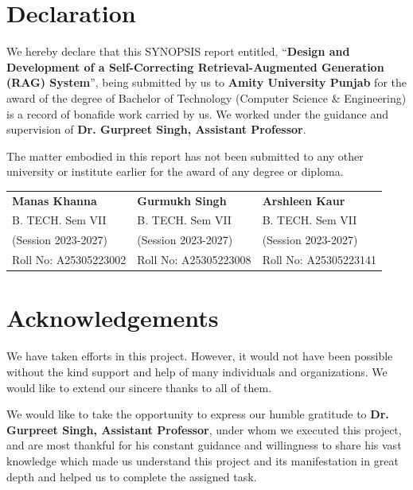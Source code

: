 \documentclass[12pt,a4paper]{article}
\begin{document}
\newpage
{}

\section*{Declaration}
We hereby declare that this SYNOPSIS report entitled, ``\textbf{Design and Development of a Self-Correcting Retrieval-Augmented Generation (RAG) System}'', being submitted by us to \textbf{Amity University Punjab} for the award of the degree of Bachelor of Technology (Computer Science \& Engineering) is a record of bonafide work carried by us. We worked under the guidance and supervision of \textbf{Dr. Gurpreet Singh, Assistant Professor}.

The matter embodied in this report has not been submitted to any other university or institute earlier for the award of any degree or diploma.

\vspace{2.5cm}

\noindent
\begin{tabularx}{\textwidth}{XXX}
    \textbf{Manas Khanna} & \textbf{Gurmukh Singh} & \textbf{Arshleen Kaur} \\
    B. TECH. Sem VII & B. TECH. Sem VII & B. TECH. Sem VII \\
    (Session 2023-2027) & (Session 2023-2027) & (Session 2023-2027) \\
    Roll No: A25305223002 & Roll No: A25305223008 & Roll No: A25305223141
\end{tabularx}

\newpage

\section*{Acknowledgements}
We have taken efforts in this project. However, it would not have been possible without the kind support and help of many individuals and organizations. We would like to extend our sincere thanks to all of them.

We would like to take the opportunity to express our humble gratitude to \textbf{Dr. Gurpreet Singh, Assistant Professor}, under whom we executed this project, and are most thankful for his constant guidance and willingness to share his vast knowledge which made us understand this project and its manifestation in great depth and helped us to complete the assigned task.
\end{document}
